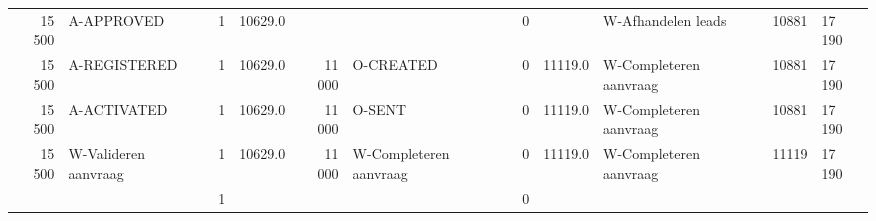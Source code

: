 \begin{tabular}{rlrlrlrllll}
15 500 & A-APPROVED & 1 & 10629.0 &  &  & 0 &  & W-Afhandelen leads & 10881 & 17 190 \\
15 500 & A-REGISTERED & 1 & 10629.0 & 11 000 & O-CREATED & 0 & 11119.0 & W-Completeren aanvraag & 10881 & 17 190 \\
15 500 & A-ACTIVATED & 1 & 10629.0 & 11 000 & O-SENT & 0 & 11119.0 & W-Completeren aanvraag & 10881 & 17 190 \\
15 500 & W-Valideren aanvraag & 1 & 10629.0 & 11 000 & W-Completeren aanvraag & 0 & 11119.0 & W-Completeren aanvraag & 11119 & 17 190 \\
 &  & 1 &  &  &  & 0 &  &  &  &  \\
\bottomrule
\end{tabular}
